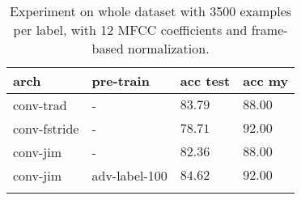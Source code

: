 \begin{table}[ht!]
\small
\begin{center}
\caption{Experiment on whole dataset with 3500 examples per label, with 12 MFCC coefficients and frame-based normalization.}
\begin{tabular}{ M{3cm}  M{2cm}  M{2.5cm}  M{2.5cm} }
\toprule
\textbf{arch} & \textbf{pre-train} & \textbf{acc test} & \textbf{acc my} \\
\midrule
conv-trad & - & $83.79 $ & $88.00 $ \\
conv-fstride & - & $78.71 $ & $92.00 $ \\
conv-jim & - & $82.36 $ & $88.00 $ \\
\midrule
conv-jim & adv-label-100 & $84.62 $ & $92.00 $ \\
\bottomrule
\label{tab:exp_final_l12}
\end{tabular}
\end{center}
\vspace{-4mm}
\end{table}
\FloatBarrier
\noindent